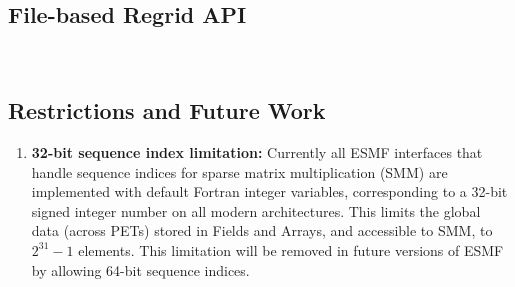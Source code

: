 \subsection{File-based Regrid API}~\label{sec:filebasedregrid}


\subsection{Restrictions and Future Work}
\begin{enumerate}

\item {\bf 32-bit sequence index limitation:} Currently all ESMF interfaces that handle sequence indices for sparse matrix multiplication (SMM) are implemented with default Fortran integer variables, corresponding to a 32-bit signed integer number on all modern architectures. This limits the global data (across PETs) stored in Fields and Arrays, and accessible to SMM, to $2^{31}-1$ elements. This limitation will be removed in future versions of ESMF by allowing 64-bit sequence indices.

\end{enumerate}
